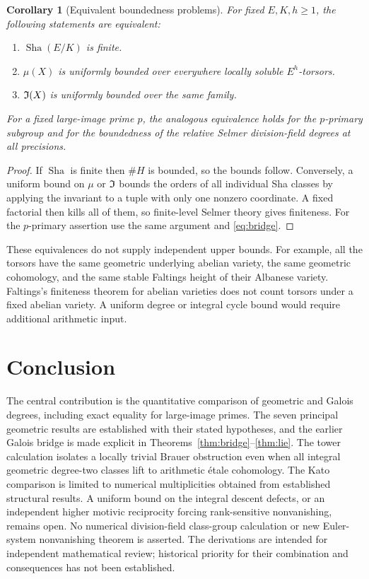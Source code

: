 \documentclass[11pt,a4paper]{article}
\newtheorem{corollary}[theorem]{Corollary}
\theoremstyle{definition}\newtheorem{definition}[theorem]{Definition}
\theoremstyle{remark}\newtheorem{remark}[theorem]{Remark}
\newcommand{\Sha}{\operatorname{\mathrm{Sha}}}
\numberwithin{equation}{section}
\begin{document}
\begin{corollary}[Equivalent boundedness problems]\label{cor:equiv}
For fixed $E,K,h\geq1$, the following statements are equivalent:
\begin{enumerate}
\item $\Sha(E/K)$ is finite.
\item $\mu(X)$ is uniformly bounded over everywhere locally soluble $E^h$-torsors.
\item $\mathfrak I(X)$ is uniformly bounded over the same family.
\end{enumerate}
For a fixed large-image prime $p$, the analogous equivalence holds for the $p$-primary subgroup and for the boundedness of the relative Selmer division-field degrees at all precisions.
\end{corollary}
\begin{proof}
If $\Sha$ is finite then $\#H$ is bounded, so the bounds follow. Conversely, a uniform bound on $\mu$ or $\mathfrak I$ bounds the orders of all individual Sha classes by applying the invariant to a tuple with only one nonzero coordinate. A fixed factorial then kills all of them, so finite-level Selmer theory gives finiteness. For the $p$-primary assertion use the same argument and \eqref{eq:bridge}.
\end{proof}
These equivalences do not supply independent upper bounds. For example, all the torsors have the same geometric underlying abelian variety, the same geometric cohomology, and the same stable Faltings height of their Albanese variety. Faltings's finiteness theorem for abelian varieties does not count torsors under a fixed abelian variety. A uniform degree or integral cycle bound would require additional arithmetic input.

\section{Conclusion}
The central contribution is the quantitative comparison of geometric and Galois degrees, including exact equality for large-image primes. The seven principal geometric results are established with their stated hypotheses, and the earlier Galois bridge is made explicit in Theorems~\ref{thm:bridge}--\ref{thm:lie}. The tower calculation isolates a locally trivial Brauer obstruction even when all integral geometric degree-two classes lift to arithmetic \'etale cohomology. The Kato comparison is limited to numerical multiplicities obtained from established structural results. A uniform bound on the integral descent defects, or an independent higher motivic reciprocity forcing rank-sensitive nonvanishing, remains open. No numerical division-field class-group calculation or new Euler-system nonvanishing theorem is asserted. The derivations are intended for independent mathematical review; historical priority for their combination and consequences has not been established.
\end{document}
